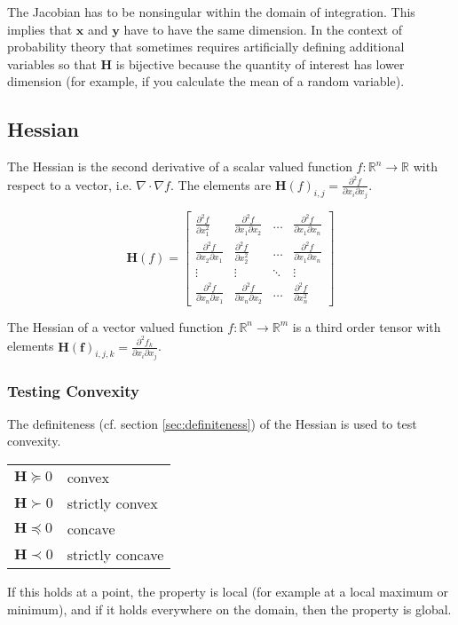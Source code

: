 The Jacobian has to be nonsingular within the domain of integration. This implies that $\mathbf{x}$ and $\mathbf{y}$ have to have the same dimension. In the context of probability theory that sometimes requires artificially defining additional variables so that $\mathbf{H}$ is bijective because the quantity of interest has lower dimension (for example, if you calculate the mean of a random variable). 

\subsection{Hessian}
\label{sec:hessian}

The Hessian is the second derivative of a scalar valued function $f:\mathbb{R}^{n} \rightarrow \mathbb{R}$ with respect to a vector, i.e. $\nabla\cdot\nabla f$. The elements are $\mathbf{H}(f)_{i,j} = \frac{\partial^2 f}{\partial x_i\partial x_j}$. 

\begin{equation}
\mathbf{H}(f) = \left[\begin{array}{cccc}
\frac{\partial^2f}{\partial x_1^2}&\frac{\partial^2f}{\partial x_1\partial x_2} & \hdots & \frac{\partial^2f}{\partial x_1\partial x_n}\\
\frac{\partial^2f}{\partial x_2\partial x_1}&\frac{\partial^2f}{\partial x_2^2} & \hdots & \frac{\partial^2f}{\partial x_1\partial x_n}\\
\vdots & \vdots & \ddots & \vdots \\
\frac{\partial^2f}{\partial x_n\partial x_1}&\frac{\partial^2f}{\partial x_n\partial x_2} & \hdots & \frac{\partial^2f}{\partial x_n^2}
\end{array} \right]
\end{equation}

The Hessian of a vector valued function $f:\mathbb{R}^n \rightarrow \mathbb{R}^m$ is a third order tensor with elements  $\mathbf{H}(\mathbf{f})_{i,j,k} = \frac{\partial^2 f_k}{\partial x_i\partial x_j}$.

\subsubsection{Testing Convexity}
The definiteness (cf. section \ref{sec:definiteness}) of the Hessian is used to test convexity.

\begin{tabular}{ll}
$\mathbf{H}\succeq 0$ & convex\\
$\mathbf{H}\succ 0$ & strictly convex\\
$\mathbf{H}\preceq 0$ & concave\\
$\mathbf{H}\prec 0$ & strictly concave\\
\end{tabular}

If this holds at a point, the property is local (for example at a local maximum or minimum), and if it holds everywhere on the domain, then the property is global.

